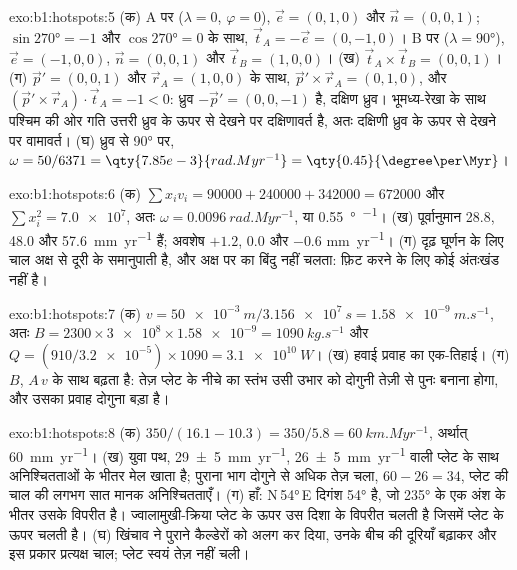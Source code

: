 \begin{solution}{exo:b1:hotspots:5}
(क) A पर ($\lambda = 0$, $\varphi = 0$), $\vec e = (0, 1, 0)$ और
$\vec n = (0, 0, 1)$; $\sin\ang{270} = -1$ और $\cos\ang{270} = 0$ के साथ,
$\vec t_A = -\vec e = (0, -1, 0)$। B पर ($\lambda = \ang{90}$),
$\vec e = (-1, 0, 0)$, $\vec n = (0, 0, 1)$ और $\vec t_B = (1, 0, 0)$।
(ख) $\vec t_A\times\vec t_B = (0, 0, 1)$। (ग) $\vec p' = (0, 0, 1)$ और
$\vec r_A = (1, 0, 0)$ के साथ, $\vec p'\times\vec r_A = (0, 1, 0)$, और
$(\vec p'\times\vec r_A)\cdot\vec t_A = -1 < 0$: ध्रुव
$-\vec p' = (0, 0, -1)$ है, दक्षिण ध्रुव। भूमध्य-रेखा के साथ पश्चिम की ओर गति उत्तरी ध्रुव के ऊपर से देखने पर दक्षिणावर्त है, अतः दक्षिणी ध्रुव के ऊपर से देखने पर वामावर्त। (घ) ध्रुव से \ang{90} पर, $\omega = 50/6371 =
\qty{7.85e-3}{rad.Myr^{-1}} = \qty{0.45}{\degree\per\Myr}$।
\end{solution}

\begin{solution}{exo:b1:hotspots:6}
(क) $\sum x_i v_i = 90000 + 240000 + 342000 = \num{672000}$ और
$\sum x_i^2 = \num{7.0e7}$, अतः $\omega = \qty{0.0096}{rad.Myr^{-1}}$, या \qty{0.55}{\degree\per\Myr}। (ख) पूर्वानुमान 28.8, 48.0 और \qty{57.6}{mm.yr^{-1}} हैं; अवशेष $+1.2$, $0.0$ और $-0.6$ \unit{mm.yr^{-1}}। (ग) दृढ़ घूर्णन के लिए चाल अक्ष से दूरी के समानुपाती है, और अक्ष पर का बिंदु नहीं चलता: फ़िट करने के लिए कोई अंतःखंड नहीं है।
\end{solution}

\begin{solution}{exo:b1:hotspots:7}
(क) $v = \qty{50e-3}{m}/\qty{3.156e7}{s} = \qty{1.58e-9}{m.s^{-1}}$, अतः
$B = 2300\times\num{3e8}\times\num{1.58e-9} = \qty{1090}{kg.s^{-1}}$ और
$Q = (910/\num{3.2e-5})\times1090 = \qty{3.1e10}{W}$। (ख) हवाई प्रवाह का एक-तिहाई। (ग) $B$, $A\,v$ के साथ बढ़ता है: तेज़ प्लेट के नीचे का स्तंभ उसी उभार को दोगुनी तेज़ी से पुनः बनाना होगा, और उसका प्रवाह दोगुना बड़ा है।
\end{solution}

\begin{solution}{exo:b1:hotspots:8}
(क) $350/(16.1 - 10.3) = 350/5.8 = \qty{60}{km.Myr^{-1}}$, अर्थात् \qty{60}{mm.yr^{-1}}। (ख) युवा पथ, \qty{29 \pm 5}{mm.yr^{-1}}, \qty{26 \pm 5}{mm.yr^{-1}} वाली प्लेट के साथ अनिश्चितताओं के भीतर मेल खाता है; पुराना भाग दोगुने से अधिक तेज़ चला, $60 - 26 = 34$, प्लेट की चाल की लगभग सात मानक अनिश्चितताएँ। (ग) हाँ: N\,\ang{54}\,E दिगंश \ang{54} है, जो \ang{235} के एक अंश के भीतर उसके विपरीत है। ज्वालामुखी-क्रिया प्लेट के ऊपर उस दिशा के विपरीत चलती है जिसमें प्लेट  के ऊपर चलती है। (घ) खिंचाव ने पुराने कैल्डेरों को अलग कर दिया, उनके बीच की दूरियाँ बढ़ाकर और इस प्रकार प्रत्यक्ष चाल; प्लेट स्वयं तेज़ नहीं चली।
\end{solution}

